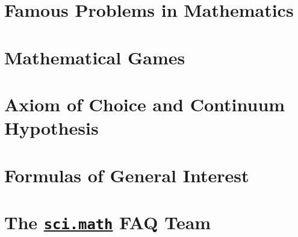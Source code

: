 \documentclass[a4paper]{report}
\begin{document}
\chapter{Famous Problems in Mathematics}
  
  
  
  
\chapter{Mathematical Games}
  
\chapter{Axiom of Choice and Continuum Hypothesis}
  
  
  
\chapter{Formulas of General Interest}
  
  
  
  
\chapter{The \href{news://sci.math}{\texttt{sci.math}} FAQ Team}
  

\cleardoublepage
{}
{}
\nocite{*}


\end{document}

